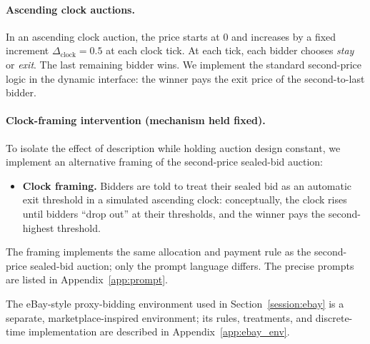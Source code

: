 \documentclass{article} %
\newif\ifmarkrev
\newcommand{\rev}[1]{\ifmarkrev\begingroup\color{red}#1\endgroup\else#1\fi}
\begin{document}
\paragraph{Ascending clock auctions.}
In an ascending clock auction, the price starts at 0 and increases by a fixed increment $\Delta_{\text{clock}}=0.5$ at each clock tick. At each tick, each bidder chooses \emph{stay} or \emph{exit}. The last remaining bidder wins. We implement the standard second-price logic in the dynamic interface: the winner pays the exit price of the second-to-last bidder.

\paragraph{\rev{Clock-framing intervention (mechanism held fixed).}}
To isolate the effect of description while holding auction design constant, we implement \rev{an alternative framing} of the second-price sealed-bid auction:
\begin{itemize}
    \item \textbf{Clock framing.} Bidders are told to treat their sealed bid as an automatic exit threshold in a simulated ascending clock: conceptually, the clock rises until bidders ``drop out'' at their thresholds, and the winner pays the second-highest threshold.
\end{itemize}
\rev{The framing implements} the same allocation and payment rule as the second-price sealed-bid auction; only the prompt language differs. The precise prompts are listed in Appendix~\ref{app:prompt}.

\rev{The eBay-style proxy-bidding environment used in Section~\ref{session:ebay} is a separate, marketplace-inspired environment; its rules, treatments, and discrete-time implementation are described in Appendix~\ref{app:ebay_env}.}
\end{document}
